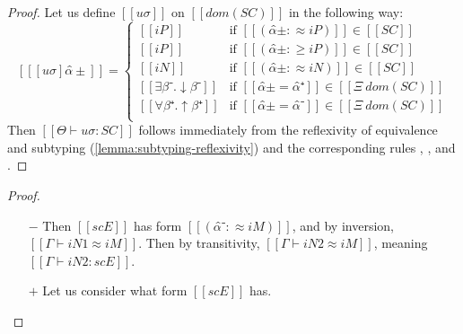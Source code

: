 \lemmaConstraintSat*
\begin{proof}
    Let us define $[[uσ]]$
    on $[[dom(SC)]]$ in the following way: 
    $$
    [[ [uσ]α̂± ]] = 
    \begin{cases}
        [[iP]]      & \text{if $[[(α̂± :≈ iP)]] \in [[SC]]$} \\
        [[iP]]      & \text{if $[[(α̂± :≥ iP)]] \in [[SC]]$} \\
        [[iN]]      & \text{if $[[(α̂± :≈ iN)]] \in [[SC]]$} \\
        [[∃β⁻.↓β⁻]] & \text{if $[[α̂± = α̂⁺]] \in [[Ξ \ dom(SC)]]$} \\
        [[∀β⁺.↑β⁺]] & \text{if $[[α̂± = α̂⁻]] \in [[Ξ \ dom(SC)]]$} \\
    \end{cases}
    $$
    Then $[[ Θ ⊢ uσ : SC ]]$ follows immediately
    from the reflexivity of equivalence and subtyping
    (\cref{lemma:subtyping-reflexivity}) and the corresponding
    rules 
    , 
    ,
    and .
\end{proof}

\lemmaEntrySatEquiv*
\begin{proof}
    \begin{itemize}
        \item [$-$] Then $[[scE]]$ has form $[[(α̂⁻ :≈ iM)]]$, 
            and by inversion, $[[Γ ⊢ iN1 ≈ iM]]$.
            Then by transitivity, $[[Γ ⊢ iN2 ≈ iM]]$, 
            meaning $[[Γ ⊢ iN2 : scE]]$.
        \item [$+$] Let us consider what form $[[scE]]$ has.
    \end{itemize}
\end{proof}

\corollarySatEquiv*

\corollaryNfSat*
